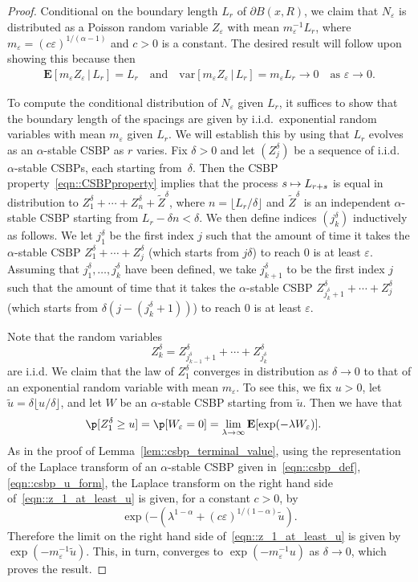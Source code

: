 \documentclass[10pt]{amsart}
\newcommand\mto{\mathchoice{\longmapsto}{\mapsto}{\mapsto}{\mapsto}}
\let\epsilon\varepsilon
\theoremstyle{plain}
\numberwithin{theorem}{section}
\theoremstyle{definition}
\newcommand \E {{\mathbf E}}
\newcommand{\var}{{\mathrm{var}}}
\let\wt\widetilde
\newcommand{\giv}{\,|\,}
\begin{document}
\begin{proof}
Conditional on the boundary length $L_r$ of $\partial B(x,R)$, we claim that $N_\epsilon$ is distributed as a Poisson random variable $Z_\epsilon$ with mean $m_\epsilon^{-1} L_r$, where $m_\epsilon = (c \epsilon)^{1/(\alpha-1)}$ and $c > 0$ is a constant. The desired result will follow upon showing this because then
\begin{align*}
	\E[ m_\epsilon Z_\epsilon \giv L_r] = L_r \quad\text{and}\quad
		\var[ m_\epsilon Z_\epsilon \giv L_r] = m_\epsilon L_r \to 0 \quad\text{as $\textstyle \epsilon \to 0$}.
\end{align*}

To compute the conditional distribution of $N_\epsilon$ given $L_r$, it suffices to show that the boundary length of the spacings are given by i.i.d.\ exponential random variables with mean $m_\epsilon$ given $L_r$. We will establish this by using that $L_r$ evolves as an $\alpha$-stable CSBP as $r$ varies. Fix $\delta > 0$ and let $(Z_j^\delta)$ be a sequence of i.i.d.\ $\alpha$-stable CSBPs, each starting from~$\delta$. Then the CSBP property~\eqref{eqn::CSBPproperty} implies that the process $s \mto L_{r+s}$ is equal in distribution to $Z_1^\delta + \cdots + Z_n^\delta + \wt{Z}^\delta$, where $n = \lfloor L_r/\delta \rfloor$ and $\wt{Z}^\delta$ is an independent $\alpha$-stable CSBP starting from $L_r - \delta n < \delta$. We then define indices $(j_k^\delta)$ inductively as follows. We let $j_1^\delta$ be the first index $j$ such that the amount of time it takes the $\alpha$-stable CSBP $Z_1^\delta + \cdots + Z_j^\delta$ (which starts from $j \delta$) to reach $0$ is at least $\epsilon$. Assuming that $j_1^\delta,\ldots,j_k^\delta$ have been defined, we take $j_{k+1}^\delta$ to be the first index $j$ such that the amount of time that it takes the $\alpha$-stable CSBP $Z_{j_k^\delta+1}^\delta + \cdots + Z_j^\delta$ (which starts from $\delta(j - (j_k^\delta+1))$) to reach $0$ is at least $\epsilon$.

Note that the random variables
\[
Z_k^\delta = Z_{j_{k-1}^\delta+1}^\delta + \cdots + Z_{j_k^\delta}^\delta
\]
are i.i.d. We claim that the law of $Z_1^\delta$ converges in distribution as $\delta \to 0$ to that of an exponential random variable with mean $m_\epsilon$. To see this, we fix $u > 0$, let $\wt{u} = \delta \lfloor u/\delta \rfloor$, and let $W$ be an $\alpha$-stable CSBP starting from $\wt{u}$. Then we have that
\begin{align}
\p[ Z_1^\delta \geq u]
&= \p[ W_\epsilon = 0]
= \lim_{\lambda \to \infty} \E[ \exp(-\lambda W_\epsilon)]. \label{eqn::z_1_at_least_u}
\end{align}
As in the proof of Lemma~\ref{lem::csbp_terminal_value}, using the representation of the Laplace transform of an $\alpha$-stable CSBP given in~\eqref{eqn::csbp_def}, \eqref{eqn::csbp_u_form}, the Laplace transform on the right hand side of~\eqref{eqn::z_1_at_least_u} is given, for a constant $c > 0$, by
\[
\exp( - (\lambda^{1-\alpha} + (c \epsilon)^{1/(1-\alpha)} \wt{u}).
\]
Therefore the limit on the right hand side of~\eqref{eqn::z_1_at_least_u} is given by $\exp(- m_\epsilon^{-1} \wt{u})$. This, in turn, converges to $\exp(-m_\epsilon^{-1} u)$ as $\delta \to 0$, which proves the result.
\end{proof}
\end{document}
